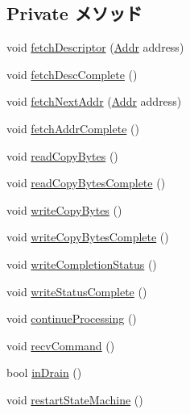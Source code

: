 \subsection*{Private メソッド}
\begin{DoxyCompactItemize}
\item 
void \hyperlink{classCopyEngine_1_1CopyEngineChannel_ade0b28ef4d83eab52f66f236473fb486}{fetchDescriptor} (\hyperlink{base_2types_8hh_af1bb03d6a4ee096394a6749f0a169232}{Addr} address)
\item 
void \hyperlink{classCopyEngine_1_1CopyEngineChannel_a603f8a373e26c50ac5daa350afde3355}{fetchDescComplete} ()
\item 
void \hyperlink{classCopyEngine_1_1CopyEngineChannel_a2569cf33044109a5a992ef1452cf7a7c}{fetchNextAddr} (\hyperlink{base_2types_8hh_af1bb03d6a4ee096394a6749f0a169232}{Addr} address)
\item 
void \hyperlink{classCopyEngine_1_1CopyEngineChannel_a35f044598c449411508cd2592e06ff8e}{fetchAddrComplete} ()
\item 
void \hyperlink{classCopyEngine_1_1CopyEngineChannel_a366c54487857e85b17043ef81def74ee}{readCopyBytes} ()
\item 
void \hyperlink{classCopyEngine_1_1CopyEngineChannel_a9bb5ef45f6e13dccc565640d1ccb8cdd}{readCopyBytesComplete} ()
\item 
void \hyperlink{classCopyEngine_1_1CopyEngineChannel_aa538c330f51ea59fafe7a1d37a776111}{writeCopyBytes} ()
\item 
void \hyperlink{classCopyEngine_1_1CopyEngineChannel_a34b0271502a103b28409e1796b16b95b}{writeCopyBytesComplete} ()
\item 
void \hyperlink{classCopyEngine_1_1CopyEngineChannel_ad307f71461c646a5e9cd24579611f827}{writeCompletionStatus} ()
\item 
void \hyperlink{classCopyEngine_1_1CopyEngineChannel_abbbcfb2dd0fad92c68dfda56b4b334b8}{writeStatusComplete} ()
\item 
void \hyperlink{classCopyEngine_1_1CopyEngineChannel_ac8396f8f0fe67599f56c870c45cd4bf7}{continueProcessing} ()
\item 
void \hyperlink{classCopyEngine_1_1CopyEngineChannel_a29f4846167c0833db565e7848de4c3a2}{recvCommand} ()
\item 
bool \hyperlink{classCopyEngine_1_1CopyEngineChannel_ae377b3f8babf5878cbeded1e190a4893}{inDrain} ()
\item 
void \hyperlink{classCopyEngine_1_1CopyEngineChannel_a9504930bccd8ae4e8593d3aefaba7548}{restartStateMachine} ()
\item 

\end{DoxyCompactItemize}
